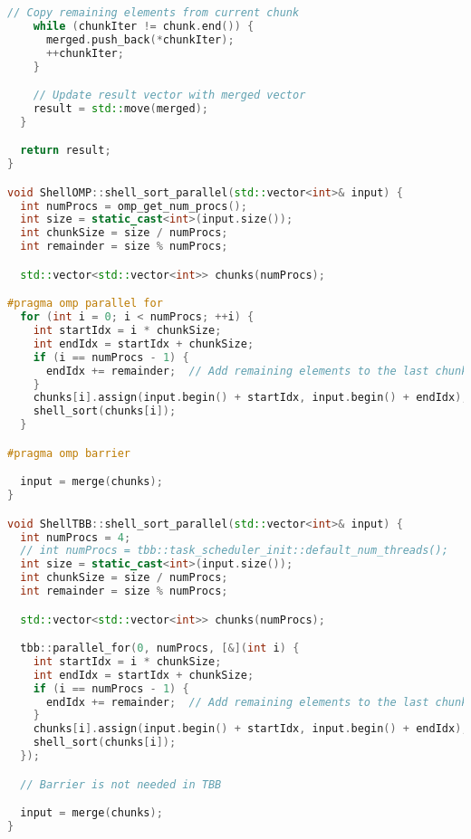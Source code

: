 \documentclass[]{article}
\theoremstyle{remark}
\theoremstyle{definition}
\begin{document}
\begin{lstlisting}[language=C++]
    // Copy remaining elements from current chunk
    while (chunkIter != chunk.end()) {
      merged.push_back(*chunkIter);
      ++chunkIter;
    }

    // Update result vector with merged vector
    result = std::move(merged);
  }

  return result;
}

void ShellOMP::shell_sort_parallel(std::vector<int>& input) {
  int numProcs = omp_get_num_procs();
  int size = static_cast<int>(input.size());
  int chunkSize = size / numProcs;
  int remainder = size % numProcs;

  std::vector<std::vector<int>> chunks(numProcs);

#pragma omp parallel for
  for (int i = 0; i < numProcs; ++i) {
    int startIdx = i * chunkSize;
    int endIdx = startIdx + chunkSize;
    if (i == numProcs - 1) {
      endIdx += remainder;  // Add remaining elements to the last chunk
    }
    chunks[i].assign(input.begin() + startIdx, input.begin() + endIdx);
    shell_sort(chunks[i]);
  }

#pragma omp barrier

  input = merge(chunks);
}

void ShellTBB::shell_sort_parallel(std::vector<int>& input) {
  int numProcs = 4;
  // int numProcs = tbb::task_scheduler_init::default_num_threads();
  int size = static_cast<int>(input.size());
  int chunkSize = size / numProcs;
  int remainder = size % numProcs;

  std::vector<std::vector<int>> chunks(numProcs);

  tbb::parallel_for(0, numProcs, [&](int i) {
    int startIdx = i * chunkSize;
    int endIdx = startIdx + chunkSize;
    if (i == numProcs - 1) {
      endIdx += remainder;  // Add remaining elements to the last chunk
    }
    chunks[i].assign(input.begin() + startIdx, input.begin() + endIdx);
    shell_sort(chunks[i]);
  });

  // Barrier is not needed in TBB

  input = merge(chunks);
}
\end{lstlisting}
\end{document}
